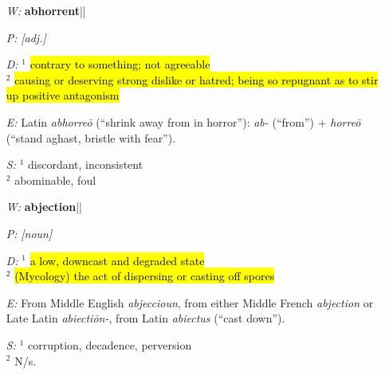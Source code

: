 \documentclass[11pt, table, dvipsnames, svgnames, x11names, xcdraw, titlepage]{article}
\begin{document}
\null

\begin{itemize}[itemsep=0pt, topsep=0pt]
\item[\textit{W:}] \textbf{abhorrent}\quad || \quad {}
\item[\textit{P:}] \textit{[adj.]}
\item[\textit{D:}] $^1$ \hl{contrary to something; not agreeable} \\
$^2$ \hl{causing or deserving strong dislike or hatred; being so repugnant as to stir up positive antagonism}
\item[\textit{E:}] Latin \textit{abhorre\={o}} (``shrink away from in horror''): \textit{ab-} (``from'') + \textit{horre\={o}} (``stand aghast, bristle with fear'').
\item[\textit{S:}] $^1$ discordant, inconsistent \\
$^2$ abominable, foul
\end{itemize}

\null

\begin{itemize}[itemsep=0pt, topsep=0pt]
\item[\textit{W:}] \textbf{abjection}\quad || \quad {}
\item[\textit{P:}] \textit{[noun]}
\item[\textit{D:}] $^1$ \hl{a low, downcast and degraded state} \\
$^2$ \hl{{\footnotesize (\textsf{Mycology})}\,\,}\hl{the act of dispersing or casting off spores}
\item[\textit{E:}] From Middle English \textit{abjeccioun}, from either Middle French \textit{abjection} or Late Latin \textit{abiecti\={o}n-}, from Latin \textit{abiectus} (``cast down'').
\item[\textit{S:}] $^1$ corruption, decadence, perversion \\
$^2$ N/s.
\end{itemize}

\null
\end{document}
